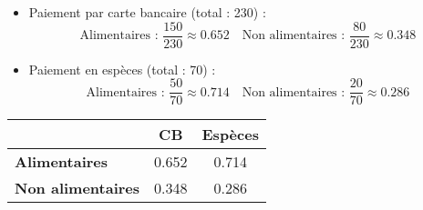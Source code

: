\documentclass[answers]{exam}
\begin{document}
\begin{solution}  

  \begin{itemize}
      \item Paiement par carte bancaire (total : 230) :
      \[
      \text{Alimentaires : } \frac{150}{230} \approx 0.652 \quad \text{Non alimentaires : } \frac{80}{230} \approx 0.348
      \]
      \item Paiement en espèces (total : 70) :
      \[
      \text{Alimentaires : } \frac{50}{70} \approx 0.714 \quad \text{Non alimentaires : } \frac{20}{70} \approx 0.286
      \]
  \end{itemize}
  
  \begin{center}
  \begin{tabular}{>{\bfseries}lcc}
  \toprule
   & CB & Espèces \\
  \midrule
  Alimentaires & 0.652 & 0.714 \\
  Non alimentaires & 0.348 & 0.286 \\
  \bottomrule
  \end{tabular}
  \end{center}

\end{solution}
\end{document}
